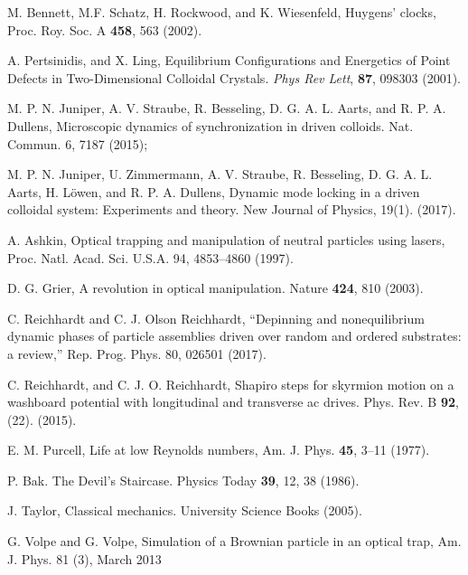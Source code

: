 \documentclass[twocolumn,showpacs,preprintnumbers,amsmath,amssymb,aps,prb]{revtex4}
\begin{document}
\begin{thebibliography}{99}
   M. Bennett, M.F. Schatz, H. Rockwood, and K. Wiesenfeld, Huygens' clocks, Proc. Roy. Soc. A {\bf 458}, 563 (2002).

    
   A. Pertsinidis, and X. Ling,  Equilibrium Configurations and Energetics of Point Defects in Two-Dimensional Colloidal Crystals. {\it Phys Rev Lett}, {\bf 87}, 098303 (2001). %

   M. P. N. Juniper, A. V. Straube, R. Besseling, D. G. A. L. Aarts, and R. P. A. Dullens, Microscopic dynamics of synchronization in driven colloids. Nat. Commun. 6, 7187 (2015); 
      
   M. P. N. Juniper,  U. Zimmermann, A. V. Straube, R. Besseling, D. G. A. L. Aarts, H. L{\"o}wen, and R. P. A. Dullens,  Dynamic mode locking in a driven colloidal system: Experiments and theory. New Journal of Physics, 19(1). (2017).  %

   A. Ashkin, Optical trapping and manipulation of neutral particles using lasers, Proc. Natl. Acad. Sci. U.S.A. 94, 4853–4860 (1997).

   D. G. Grier, A revolution in optical manipulation. Nature {\bf 424}, 810 (2003).

   C. Reichhardt and C. J. Olson Reichhardt, “Depinning and nonequilibrium dynamic phases of particle assemblies driven over random and ordered substrates: a review,” Rep. Prog. Phys. 80, 026501 (2017).

   C. Reichhardt, and C. J. O. Reichhardt,  Shapiro steps for skyrmion motion on a washboard potential with longitudinal and transverse ac drives. Phys. Rev. B {\bf 92}, (22). (2015).      

   E. M. Purcell, Life at low Reynolds numbers, Am. J. Phys. {\bf 45}, 3–11 (1977).
  
   P. Bak. The Devil's Staircase. Physics Today {\bf 39}, 12, 38 (1986).

   J. Taylor,  Classical mechanics. University Science Books (2005).

   G. Volpe and G. Volpe, Simulation of a Brownian particle in an optical trap, Am. J. Phys. 81 (3), March 2013


\end{thebibliography}
\end{document}
